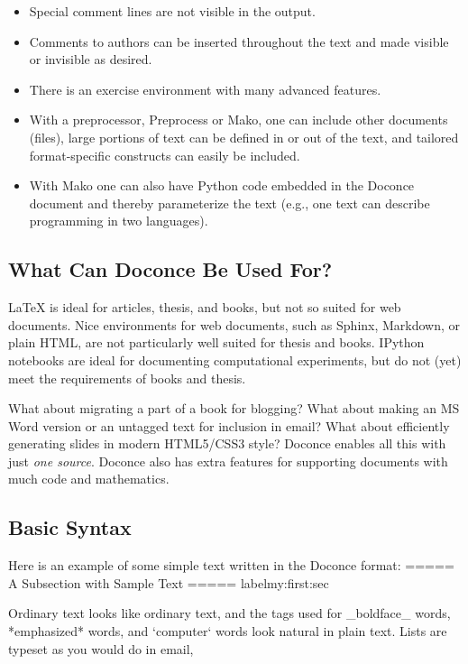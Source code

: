 \documentclass[%
oneside,                 %
final,                   %
10pt]{article}
\begin{document}
\begin{itemize}
  \item Special comment lines are not visible in the output.

  \item Comments to authors can be inserted throughout the text and
    made visible or invisible as desired.

  \item There is an exercise environment with many advanced features.

  \item With a preprocessor, Preprocess or Mako, one can include
    other documents (files), large portions of text can be defined
    in or out of the text, and tailored format-specific constructs can easily
    be included.

  \item With Mako one can also have Python code
    embedded in the Doconce document and thereby parameterize the
    text (e.g., one text can describe programming in two languages).
\end{itemize}

\noindent
\subsection{What Can Doconce Be Used For?}

{\LaTeX} is ideal for articles, thesis, and books, but not so suited
for web documents. Nice environments for web documents, such as
Sphinx, Markdown, or plain HTML, are not particularly well
suited for thesis and books. IPython notebooks are ideal for
documenting computational experiments, but do not (yet) meet the
requirements of books and thesis.

What about migrating a part of a book for blogging? What about
making an MS Word version or an untagged text for inclusion in email?
What about efficiently generating slides in modern HTML5/CSS3 style?
Doconce enables all this with just \emph{one source}. Doconce also has
extra features for supporting documents with much code and mathematics.

\subsection{Basic Syntax}

Here is an example of some simple text written in the Doconce format:
\bccq
===== A Subsection with Sample Text =====
label{my:first:sec}

Ordinary text looks like ordinary text, and the tags used for
_boldface_ words, *emphasized* words, and `computer` words look
natural in plain text.  Lists are typeset as you would do in email,
\end{document}
